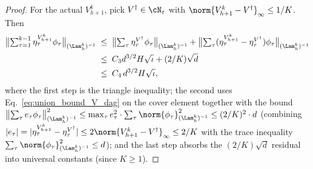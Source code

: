 \begin{proof}
For the actual $V_{h+1}^k$, pick $V^\dagger \in \cN_\varepsilon$ with $\norm{V_{h+1}^k - V^\dagger}_\infty \le 1/K$. Then
\begin{align*}
\bigl\| \textstyle\sum_{\tau=1}^{k-1} \eta_\tau^{V_{h+1}^k} \phi_\tau \bigr\|_{(\Lam_h^k)^{-1}}
&\;\le\; \bigl\| \textstyle\sum_\tau \eta_\tau^{V^\dagger} \phi_\tau \bigr\|_{(\Lam_h^k)^{-1}} + \bigl\| \textstyle\sum_\tau (\eta_\tau^{V_{h+1}^k} - \eta_\tau^{V^\dagger}) \phi_\tau \bigr\|_{(\Lam_h^k)^{-1}} \\
&\;\le\; C_3 d^{3/2} H \sqrt{\iota} + (2/K) \sqrt{d} \\
&\;\le\; C_4 \, d^{3/2} H \sqrt{\iota},
\end{align*}
where the first step is the triangle inequality; the second uses Eq.~\eqref{eq:union_bound_V_dag} on the cover element together with the bound $\bigl\| \sum_\tau e_\tau \phi_\tau \bigr\|_{(\Lam_h^k)^{-1}}^2 \le \max_\tau e_\tau^2 \cdot \sum_\tau \norm{\phi_\tau}_{(\Lam_h^k)^{-1}}^2 \le (2/K)^2 \cdot d$ (combining $|e_\tau| = |\eta_\tau^{V_{h+1}^k} - \eta_\tau^{V^\dagger}| \le 2\norm{V_{h+1}^k - V^\dagger}_\infty \le 2/K$ with the trace inequality $\sum_\tau \norm{\phi_\tau}_{(\Lam_h^k)^{-1}}^2 \le d$); and the last step absorbs the $(2/K)\sqrt d$ residual into universal constants (since $K \ge 1$).


\end{proof}
